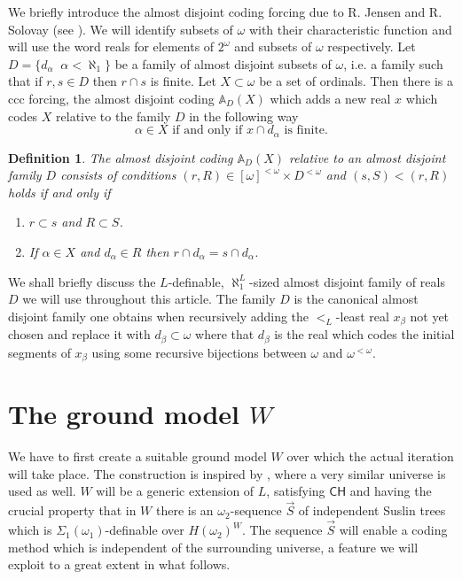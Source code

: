 \documentclass[a4paper,11pt]{article}
\newtheorem{definition}[theorem]{Definition}
\newcommand{\CH}{\mathsf{CH}}
\begin{document}
We briefly introduce the almost disjoint coding forcing due to R. Jensen and R. Solovay (see \cite{JS}). We will identify subsets of $\omega$ with their characteristic function and will use the word reals for elements of $2^{\omega}$ and subsets of $\omega$ respectively.
Let $D=\{d_{\alpha} \, \: \, \alpha < \aleph_1 \}$ be a family of almost disjoint subsets of $\omega$, i.e. a family such that if $r, s \in D$ then 
$r \cap s$ is finite. Let $X\subset  \omega$  be a set of ordinals. Then there 
is a ccc forcing, the almost disjoint coding $\mathbb{A}_D(X)$ which adds 
a new real $x$ which codes $X$ relative to the family $D$ in the following way
$$\alpha \in X \text{ if and only if } x \cap d_{\alpha} \text{ is finite.}$$
\begin{definition}\label{definitionadcoding}
 The almost disjoint coding $\mathbb{A}_D(X)$ relative to an almost disjoint family $D$ consists of
 conditions $(r, R) \in [\omega]^{<\omega} \times D^{<\omega}$ and
 $(s,S) < (r,R)$ holds if and only if
 \begin{enumerate}
  \item $r \subset s$ and $R \subset S$.
  \item If $\alpha \in X$ and $d_{\alpha} \in R$ then $r \cap d_{\alpha} = s \cap d_{\alpha}$.
 \end{enumerate}
\end{definition}
We shall briefly discuss the $L$-definable, $\aleph_1^L$-sized almost disjoint family of reals $D$  we will use throughout this article. The family $D$ is the canonical almost disjoint family one obtains when recursively adding the $<_L$-least real $x_{\beta}$ not yet chosen and replace it with $d_{\beta} \subset \omega$ where that $d_{\beta}$  is the real which codes the initial segments of $x_{\beta}$ using some recursive bijections between $\omega$ and $\omega^{<\omega}$. 



\section{The ground model $W$}

We have to first create a suitable ground model $W$ over which the actual iteration will take place. The construction is inspired by \cite{Ho2}, where a very similar universe is used as well. $W$ will be a generic extension of $L$, satisfying $\CH$ and {having} the crucial property that in $W$ there is an $\omega_2$-sequence $\vec{S}$ of independent Suslin trees which is $\Sigma_1(\omega_1)$-definable over $H(\omega_2)^W$. The sequence $\vec{S}$ will enable a coding method which is independent of the surrounding universe, a feature we will exploit to a great extent in {what follows}.
\end{document}
